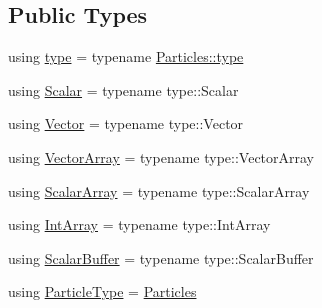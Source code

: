 \subsection*{Public Types}
\begin{DoxyCompactItemize}
\item 
using \mbox{\hyperlink{class_space_h_1_1_particle_system_a21376735739dfbe668a70cdba008baa3}{type}} = typename \mbox{\hyperlink{class_space_h_1_1_vel_indep_particles_a09aa167b5fb1b203ab021220601ed74c}{Particles\+::type}}
\item 
using \mbox{\hyperlink{class_space_h_1_1_particle_system_a522770dcfaf8b29aed35ea9348185a34}{Scalar}} = typename type\+::\+Scalar
\item 
using \mbox{\hyperlink{class_space_h_1_1_particle_system_a7cb2705f7e4edf94131c31eda3edfded}{Vector}} = typename type\+::\+Vector
\item 
using \mbox{\hyperlink{class_space_h_1_1_particle_system_acf48c66c8d42b85cd3a77911bb7da9ce}{Vector\+Array}} = typename type\+::\+Vector\+Array
\item 
using \mbox{\hyperlink{class_space_h_1_1_particle_system_a7c621641dbb2bb4192af568758ed07bb}{Scalar\+Array}} = typename type\+::\+Scalar\+Array
\item 
using \mbox{\hyperlink{class_space_h_1_1_particle_system_a833833592d4c4750bbfa021610e94619}{Int\+Array}} = typename type\+::\+Int\+Array
\item 
using \mbox{\hyperlink{class_space_h_1_1_particle_system_a71f8e04a3c8adc44b2a8b41e0cd55278}{Scalar\+Buffer}} = typename type\+::\+Scalar\+Buffer
\item 
using \mbox{\hyperlink{class_space_h_1_1_particle_system_af4779451c05c70a4c7812f530c9ad057}{Particle\+Type}} = \mbox{\hyperlink{struct_space_h_1_1_particles}{Particles}}
\end{DoxyCompactItemize}
